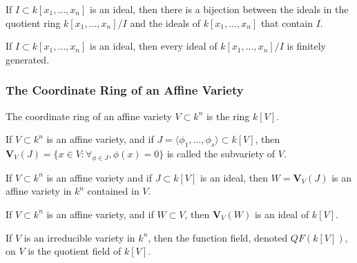                 \begin{theorem}
                    If $I\subset k[x_1,\hdots ,x_n]$ is an ideal,
                    then there is a bijection between the ideals
                    in the quotient ring $k[x_1,\hdots ,x_n]/I$
                    and the ideals of $k[x_1,\hdots ,x_n]$
                    that contain $I$.
                \end{theorem}
                \begin{theorem}
                    If $I\subset k[x_1,\hdots ,x_n]$ is an ideal,
                    then every ideal of $k[x_1,\hdots ,x_n]/I$
                    is finitely generated.
                \end{theorem}
            \subsubsection{The Coordinate Ring of an Affine Variety}
                \begin{definition}
                    The coordinate ring of an affine variety
                    $V\subset k^n$ is the ring $k[V]$.
                \end{definition}
                \begin{definition}
                    If $V\subset k^n$ is an affine variety, and if
                    $J=\langle\phi_1,\hdots,\phi_s\rangle\subset k[V]$,
                    then
                    $\mathbf{V}_{V}(J)%
                     =\{x\in V:\forall_{\phi \in J},\phi(x)=0\}$
                    is called the subvariety of $V$.
                \end{definition}
                \begin{theorem}
                    If $V\subset k^n$ is an affine variety and if
                    $J\subset k[V]$ is an ideal, then
                    $W=\mathbf{V}_{V}(J)$ is an affine variety
                    in $k^n$ contained in $V$.
                \end{theorem}
                \begin{theorem}
                    If $V\subset k^n$ is an affine variety,
                    and if $W\subset V$, then $\mathbf{V}_{V}(W)$
                    is an ideal of $k[V]$.
                \end{theorem}
                \begin{definition}
                    If $V$ is an irreducible variety in $k^n$,
                    then the function field, denoted $QF(k[V])$,
                    on $V$ is the quotient field of $k[V]$.
                \end{definition}
